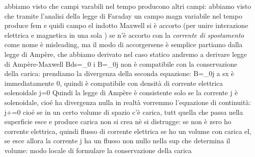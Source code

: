 %
%
%


abbiamo visto che campi varabili nel tempo producono altri campi: abbiamo visto che tramite l'analisi della legge di Faraday un campo magn variabile nel tempo produce fem e quidi campo el indotto
Maxwell si è accorto (per unire interazione elettrica e magnetica in una sola ) 
se n'è accorto con la \textit{corrente di spostamento}
come nome è misleading, ma il modo di accorgersene è semplice
partiamo dalla legge di Ampère, che abbiamo derivato nel caso statico 
andremo a derivare legge di Ampère-Maxwell
\oint\vba Bd\vba s=\mu_0 i
\curl\vba B=\mu_0\vba j
non è compatibile con la conservazione della carica: prendiamo la divergenza della seconda equazione: \grad\curl\vba B=\mu_0\grad\vba j
a sx è immediatamente 0, quindi è compatibile con densità di corrente elettrica solenoidale \div\vba j=0
Quindi la legge di Ampère è consistente solo se la corrente \vba j è solenoidale, cioé ha divergenza nulla
in realtà vorremmo l'equazione di continuità: \div\vba j+=0	cioé se in un certo volume di spazio c'è carica, tutt quella che passa nella superficie esce e produce carica
non si crea nè si distrugge: se non è zero ho corrente elettrica, quindi flusso di corrente elettrica
se ho un volume con carica el, se esce allora la corrente j ha un flusso non nullo nella sup che determina il volume: modo locale di formulare la conservazione della carica

